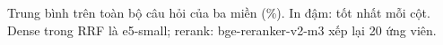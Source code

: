 Trung bình trên toàn bộ câu hỏi của ba miền (\%). In đậm: tốt nhất mỗi cột. Dense trong RRF là e5-small; rerank: bge-reranker-v2-m3 xếp lại 20 ứng viên.
